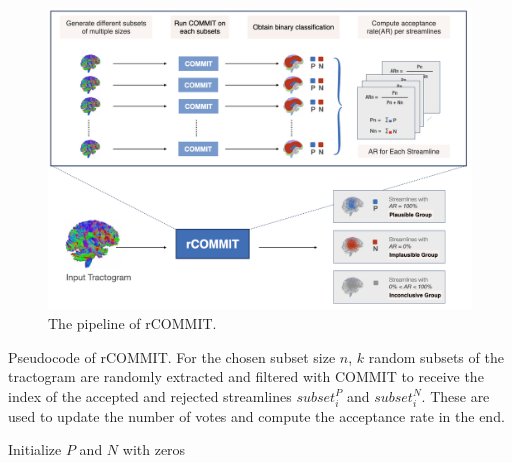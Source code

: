 \begin{figure}[ht]
    \centering
    \includegraphics[width= 16cm]{figures/pipe.png}
        \caption{The pipeline of rCOMMIT. }
    \label{fig:pipe}
\end{figure}


\begin{algorithm}
    \caption{Pseudocode of rCOMMIT. For the chosen subset size $n$, $k$ random subsets of the tractogram are randomly extracted and filtered with COMMIT to 
    receive the index of the accepted and rejected streamlines $subset_i^P$ and $subset_i^N$. These are used to update the number of votes and compute the acceptance rate in the end.}
    
    
    
    \BlankLine
    \BlankLine
    Initialize $P$ and $N$ with zeros\\
    \label{fig:algo}
    
\end{algorithm}

